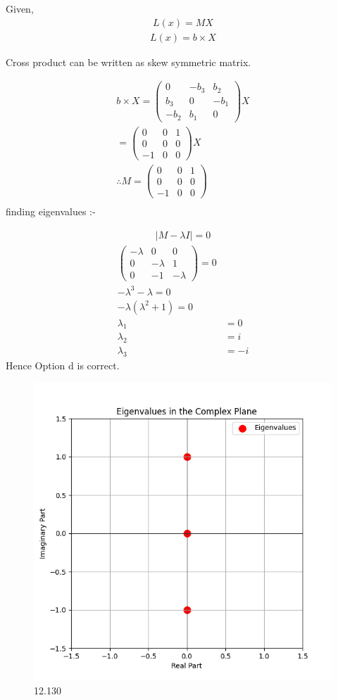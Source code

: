 \documentclass[journal]{IEEEtran}
\begin{document}
Given, \begin{align}L(x) = MX
\end{align}
\begin{align}L(x) = b \times X\end{align}

Cross product can be written as skew symmetric matrix.

\begin{align}b \times X = \begin{pmatrix}0 & -b_3 & b_2 \\b_3 & 0 & -b_1 \\-b_2 & b_1 & 0\end{pmatrix}X\\
=\begin{pmatrix}0 & 0 & 1 \\0 & 0 & 0 \\-1 & 0 & 0\end{pmatrix}X\\
\therefore M =\begin{pmatrix}0 & 0 & 1 \\0 & 0 & 0 \\-1 & 0 & 0\end{pmatrix}\\
\end{align}
finding eigenvalues :-

\begin{align}|M - \lambda I| = 0\end{align}
\begin{align}
\begin{pmatrix}-\lambda & 0 & 0 \\0 & -\lambda & 1 \\0 & -1 & -\lambda\end{pmatrix} = 0\\
-\lambda^3 - \lambda = 0\\
-\lambda(\lambda^2 + 1) = 0\\
\lambda_1 &= 0 \\\lambda_2 &= i \\\lambda_3 &= -i
\end{align}
Hence Option d is correct.

\begin{figure}
    \centering
    \includegraphics[width=0.85\columnwidth]{figs/graph-20.png}
    \caption{12.130}
    \label{fig:placeholder}
\end{figure}
\end{document}
